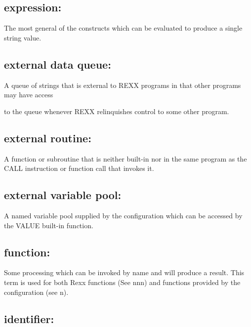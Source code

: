 \hypertarget{expression}{%
\subsection{expression:}\label{expression}}

The most general of the constructs which can be evaluated to produce a
single string value.

\hypertarget{external-data-queue}{%
\subsection{external data queue:}\label{external-data-queue}}

A queue of strings that is external to REXX programs in that other
programs may have access

to the queue whenever REXX relinquishes control to some other program.

\hypertarget{external-routine}{%
\subsection{external routine:}\label{external-routine}}

A function or subroutine that is neither built-in nor in the same
program as the CALL instruction or function call that invokes it.

\hypertarget{external-variable-pool}{%
\subsection{external variable pool:}\label{external-variable-pool}}

A named variable pool supplied by the configuration which can be
accessed by the VALUE built-in function.

\hypertarget{function}{%
\subsection{function:}\label{function}}

Some processing which can be invoked by name and will produce a result.
This term is used for both Rexx functions (See nnn) and functions
provided by the configuration (see n).

\hypertarget{identifier}{%
\subsection{identifier:}\label{identifier}}

